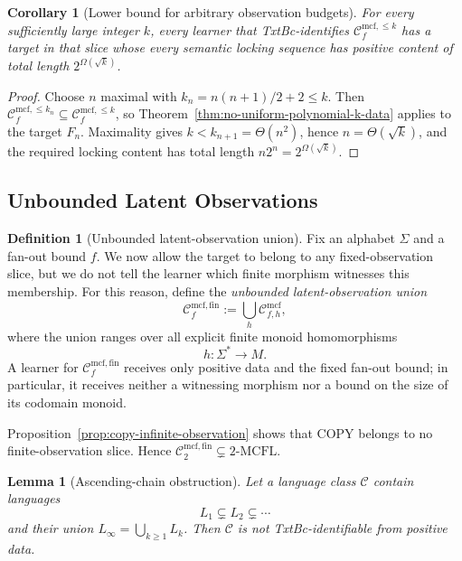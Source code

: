 \documentclass[11pt,a4paper]{article}
\numberwithin{equation}{section}
\theoremstyle{plain}
\newtheorem{lemma}[theorem]{Lemma}
\newtheorem{corollary}[theorem]{Corollary}
\theoremstyle{definition}
\newtheorem{definition}[theorem]{Definition}
\theoremstyle{remark}
\newcommand{\Cmcf}[2]{\mathcal{C}^{\mathrm{mcf}}_{#1,#2}}
\newcommand{\Clatent}[2]{\mathcal{C}^{\mathrm{mcf},\le #2}_{#1}}
\newcommand{\Callobs}[1]{\mathcal{C}^{\mathrm{mcf},\mathrm{fin}}_{#1}}
\begin{document}
\begin{corollary}[Lower bound for arbitrary observation budgets]
\label{cor:locking-lower-bound-all-k}
For every sufficiently large integer $k$, every learner that TxtBc-identifies
$\Clatent{f}{k}$ has a target in that slice whose every semantic locking
sequence has positive content of total length $2^{\Omega(\sqrt{k})}$.
\end{corollary}

\begin{proof}
Choose $n$ maximal with $k_n=n(n+1)/2+2\le k$.  Then
$\Clatent{f}{k_n}\subseteq\Clatent{f}{k}$, so
Theorem~\ref{thm:no-uniform-polynomial-k-data} applies to the target $F_n$.
Maximality gives $k<k_{n+1}=\Theta(n^2)$, hence
$n=\Theta(\sqrt{k})$, and the required locking content has total length
$n2^n=2^{\Omega(\sqrt{k})}$.
\end{proof}


\subsection{Unbounded Latent Observations}
\begin{definition}[Unbounded latent-observation union]
\label{def:no-advice-union}
Fix an alphabet \(\Sigma\) and a fan-out bound \(f\).  We now allow the target
to belong to any fixed-observation slice, but we do not tell the learner which
finite morphism witnesses this membership.  For this reason, define the
\emph{unbounded latent-observation union}
\[
  \Callobs{f}
  :=
  \bigcup_h \Cmcf{f}{h},
\]
where the union ranges over all explicit finite monoid homomorphisms
\[
  h:\Sigma^*\to M.
\]
A learner for \(\Callobs{f}\) receives only positive data and the fixed
fan-out bound; in particular, it receives neither a witnessing morphism nor a
bound on the size of its codomain monoid.
\end{definition}

Proposition~\ref{prop:copy-infinite-observation} shows that COPY belongs to no
finite-observation slice.  Hence
$\Callobs{2}\subsetneq2\text{-}\mathrm{MCFL}$.

\begin{lemma}[Ascending-chain obstruction]
\label{lem:ascending-chain-obstruction}
Let a language class \(\mathcal C\) contain languages
\[
  L_1\subsetneq L_2\subsetneq\cdots
\]
and their union \(L_\infty=\bigcup_{k\ge1}L_k\).  Then \(\mathcal C\) is not TxtBc-identifiable from positive data.
\end{lemma}
\end{document}
